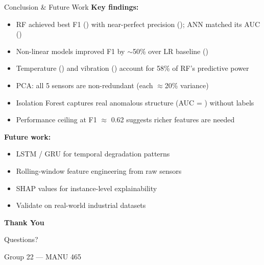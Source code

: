 \documentclass[aspectratio=169]{beamer}
\begin{document}
\begin{frame}{Conclusion \& Future Work}
\textbf{Key findings:}
\begin{itemize}
    \item RF achieved best F1 (\rfFone) with near-perfect precision (\rfPrec); ANN matched its AUC (\annAuc)
    \item Non-linear models improved F1 by $\sim$50\%  over LR baseline (\lrFone)
    \item Temperature (\rfImpA) and vibration (\rfImpB) account for 58\% of RF's predictive power
    \item PCA: all 5 sensors are non-redundant (each $\approx$20\% variance)
    \item Isolation Forest captures real anomalous structure (AUC = \isoAuc) without labels
    \item Performance ceiling at F1 $\approx$ 0.62 suggests richer features are needed
\end{itemize}

\vspace{0.4cm}
\textbf{Future work:}
\begin{itemize}
    \item LSTM / GRU for temporal degradation patterns
    \item Rolling-window feature engineering from raw sensors
    \item SHAP values for instance-level explainability
    \item Validate on real-world industrial datasets
\end{itemize}
\end{frame}

\begin{frame}
\centering
\Huge \textbf{Thank You}

\vspace{0.5cm}
\Large Questions?

\vspace{0.5cm}
\normalsize
Group 22 --- MANU 465
\end{frame}
\end{document}
